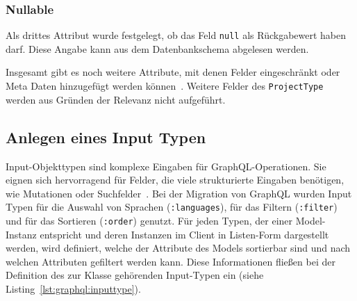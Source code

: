 \subsubsection{Nullable}
Als drittes Attribut wurde festgelegt, ob das Feld \texttt{null} als Rückgabewert haben darf. Diese Angabe kann aus dem Datenbankschema abgelesen werden.

Insgesamt gibt es noch  weitere Attribute, mit denen Felder eingeschränkt oder Meta Daten hinzugefügt werden können~\cite{graphql-field-introduction}.
Weitere Felder des \texttt{ProjectType} werden aus Gründen der Relevanz nicht aufgeführt. 

\subsection{Anlegen eines Input Typen}
\label{impl:graphql:input}
Input-Objekttypen sind komplexe Eingaben für GraphQL-Operationen. Sie eignen sich hervorragend für Felder, die viele strukturierte Eingaben benötigen, wie Mutationen oder Suchfelder~\cite{graphql-input-type}.
Bei der Migration von GraphQL wurden Input Typen für die Auswahl von Sprachen (\texttt{:languages}), für das Filtern (\texttt{:filter}) und für das Sortieren (\texttt{:order}) genutzt.
Für jeden Typen, der einer Model-Instanz entspricht und deren Instanzen im Client in Listen-Form dargestellt werden, wird definiert, welche der Attribute des Models sortierbar sind und nach welchen Attributen gefiltert werden kann. Diese Informationen fließen bei der Definition des zur Klasse gehörenden Input-Typen ein (siehe Listing~\ref{lst:graphql:inputtype}).

